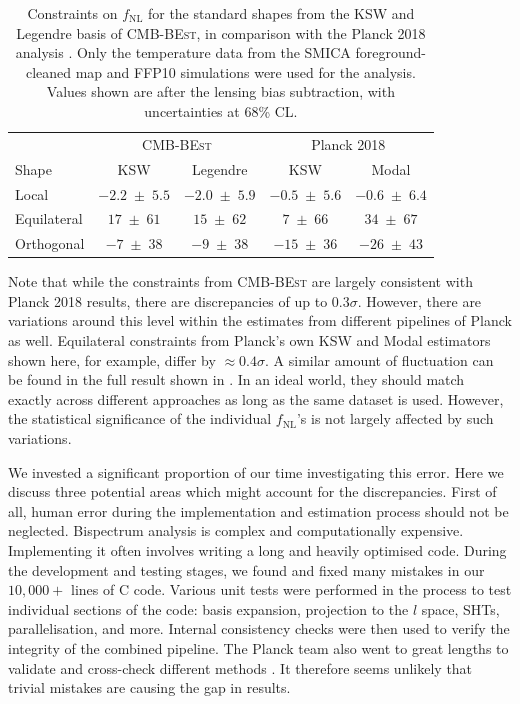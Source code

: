 \begin{table}[h]
	\caption{Constraints on $f_\text{NL}$ for the standard shapes from the KSW and Legendre basis of \textsc{CMB-BEst}, in comparison with the Planck 2018 analysis \cite{PlanckCollaboration2018}. Only the temperature data from the SMICA foreground-cleaned map and FFP10 simulations were used for the analysis. Values shown are after the lensing bias subtraction, with uncertainties at 68\% CL.}
	\centering
	\label{table:trio_fNL_comparison_with_planck}
	\renewcommand{\arraystretch}{1.5} 
	\begin{tabular}{lcccc}
		\toprule
		& \multicolumn{2}{c}{\textsc{CMB-BEst}} & \multicolumn{2}{c}{Planck 2018} \\ \cmidrule(lr){2-3} \cmidrule(lr){4-5}
		Shape & KSW &  Legendre &  KSW &  Modal \\
		\midrule
		
		Local & $-2.2 \;\pm\; 5.5$ & $-2.0 \;\pm\; 5.9$ & $-0.5 \;\pm\; 5.6$ & $-0.6 \;\pm\; 6.4$ \\
		Equilateral & $17 \;\pm\; 61$ & $15 \;\pm\; 62$ & $7 \;\pm\; 66$ & $34 \;\pm\; 67$ \\
		Orthogonal & $-7 \;\pm\; 38$ & $-9 \;\pm\; 38$ & $-15 \;\pm\; 36$ & $-26 \;\pm\; 43$ \\
		\bottomrule
	\end{tabular}
\end{table}

Note that while the constraints from \textsc{CMB-BEst} are largely consistent with Planck 2018 results, there are discrepancies of up to $0.3\sigma$. However, there are variations around this level within the estimates from different pipelines of Planck as well. Equilateral constraints from Planck's own KSW and Modal estimators shown here, for example, differ by $\approx 0.4\sigma$. A similar amount of fluctuation can be found in the full result shown in \cite{PlanckCollaboration2018}. In an ideal world, they should match exactly across different approaches as long as the same dataset is used. However, the statistical significance of the individual $f_\text{NL}$'s is not largely affected by such variations.

We invested a significant proportion of our time investigating this error. Here we discuss three potential areas which might account for the discrepancies. First of all, human error during the implementation and estimation process should not be neglected. Bispectrum analysis is complex and computationally expensive. Implementing it often involves writing a long and heavily optimised code. During the development and testing stages, we found and fixed many mistakes in our $10,000+$ lines of \textsc{C} code. Various unit tests were performed in the process to test individual sections of the code: basis expansion, projection to the $l$ space, SHTs, parallelisation, and more. Internal consistency checks were then used to verify the integrity of the combined pipeline. The Planck team also went to great lengths to validate and cross-check different methods \cite{PlanckCollaboration2013}. It therefore seems unlikely that trivial mistakes are causing the gap in results.

